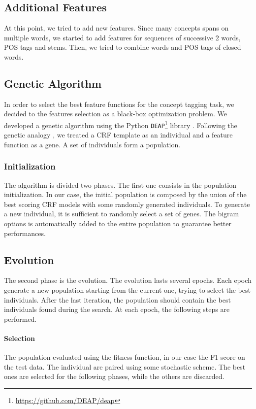 \subsection{Additional Features}
\label{subsection:additional}
At this point, we tried to add new features. 
Since many concepts spans on multiple words, we started to add features for sequences of successive 2 words, \ac{POS} tags and stems.
Then, we tried to combine words and \ac{POS} tags of closed words.

\subsection{Genetic Algorithm}
\label{subsection:genetic}
In order to select the best feature functions for the concept tagging task, we decided to the features selection as a black-box optimization problem.
We developed a genetic algorithm using the Python \texttt{DEAP}\footnote{\url{https://github.com/DEAP/deap}} library \cite{deap}.
Following the genetic analogy \cite{lion}, we treated a \ac{CRF} template as an individual and a feature function as a gene.
A set of individuals form a population.

\subsubsection{Initialization}
The algorithm is divided two phases.
The first one consists in the population initialization.
In our case, the initial population is composed by the union of the best scoring \ac{CRF} models with some randomly generated individuals.
To generate a new individual, it is sufficient to randomly select a set of genes.
The bigram options is automatically added to the entire population to guarantee better performances.

\subsection{Evolution}
The second phase is the evolution.
The evolution lasts several epochs.
Each epoch generate a new population starting from the current one, trying to select the best individuals.
After the last iteration, the population should contain the best individuals found during the search.
At each epoch, the following steps are performed.

\paragraph{Selection}
The population evaluated using the fitness function, in our case the F1 score on the test data.
The individual are paired using some stochastic scheme.
The best ones are selected for the following phases, while the others are discarded.

